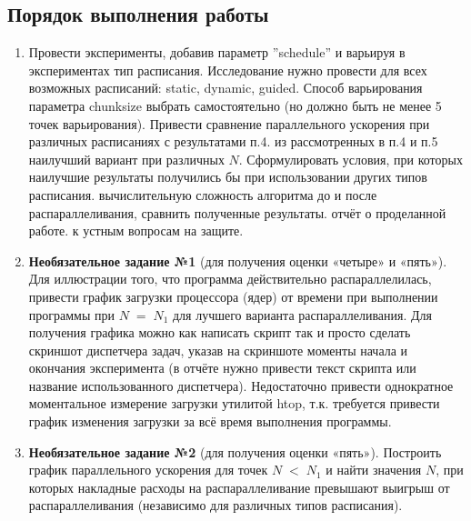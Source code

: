 { %
	\subsection{Порядок выполнения работы}
	\begin{enumerate}
		 во все for-циклы в программе из ЛР №1 следующую директиву OpenMP: \\	
''\#pragma omp parallel for default(none) private(...) shared(...)''. Наличие всех перечисленных параметров в указанной директиве является обязательным.
		 все for-циклы на внутренние зависимости по данным между итерациями. Если зависимости обнаружились, использовать для защиты критических секций директиву ''\#pragma omp critical'' или ''\#pragma omp atomic'' (если операция атомарна), или параметр reduction (предпочтительнее) или вообще отказаться от распараллеливания цикла (свой выбор необходимо обосновать).
		, что получившаяся программа обладает свойством прямой совместимости с компиляторами, не поддерживающими \\OpenMP (для проверки этого можно скомпилировать программу без опции ''–fopenmp'', в результате не должно быть сообщений об ошибках, а программа должна корректно работать).
		 эксперименты, замеряя параллельное ускорение. Привести сравнение графиков параллельного ускорения с ЛР №1 и ЛР №2.  
		\item Провести эксперименты, добавив параметр ''schedule'' и варьируя в экспериментах тип расписания. Исследование нужно провести для всех возможных расписаний: static, dynamic, guided. Способ варьирования параметра chunk\textunderscore size выбрать самостоятельно (но должно быть не менее 5 точек варьирования). Привести сравнение параллельного ускорения при различных расписаниях с результатами п.4.
		 из рассмотренных в п.4 и п.5 наилучший вариант при различных $N$. Сформулировать условия, при которых наилучшие результаты получились бы при использовании других типов расписания.
		 вычислительную сложность алгоритма до и после распараллеливания, сравнить полученные результаты.
		 отчёт о проделанной работе.
		 к устным вопросам на защите.
		\item\textbf{Необязательное задание №1} (для получения оценки «четыре» и «пять»). Для иллюстрации того, что программа действительно распараллелилась, привести график загрузки процессора (ядер) от времени при выполнении программы при $N\;=\;N_1$ для лучшего варианта распараллеливания. Для получения графика можно как написать скрипт 
так и просто сделать скриншот диспетчера задач, указав на скриншоте моменты начала и окончания эксперимента (в отчёте нужно привести текст скрипта или название использованного диспетчера). Недостаточно привести однократное моментальное измерение загрузки утилитой htop, т.к. требуется привести график изменения загрузки за всё время выполнения программы.
		\item\textbf{Необязательное задание №2} (для получения оценки «пять»). Построить график параллельного ускорения для точек $N\;<\;N_1$ и найти значения $N$, при которых накладные расходы на распараллеливание превышают выигрыш от распараллеливания (независимо для различных типов расписания).
	\end{enumerate}
}